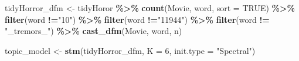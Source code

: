\documentclass[
]{article}
\newenvironment{Shaded}{\begin{snugshade}}{\end{snugshade}}
\newcommand{\AttributeTok}[1]{\textcolor[rgb]{0.13,0.29,0.53}{#1}}
\newcommand{\ConstantTok}[1]{\textcolor[rgb]{0.56,0.35,0.01}{#1}}
\newcommand{\DecValTok}[1]{\textcolor[rgb]{0.00,0.00,0.81}{#1}}
\newcommand{\FunctionTok}[1]{\textcolor[rgb]{0.13,0.29,0.53}{\textbf{#1}}}
\newcommand{\NormalTok}[1]{#1}
\newcommand{\OtherTok}[1]{\textcolor[rgb]{0.56,0.35,0.01}{#1}}
\newcommand{\SpecialCharTok}[1]{\textcolor[rgb]{0.81,0.36,0.00}{\textbf{#1}}}
\newcommand{\StringTok}[1]{\textcolor[rgb]{0.31,0.60,0.02}{#1}}
\begin{document}
\begin{Shaded}
\begin{Highlighting}[]
\NormalTok{tidyHorror\_dfm }\OtherTok{\textless{}{-}}\NormalTok{ tidyHoror }\SpecialCharTok{\%\textgreater{}\%} 
  \FunctionTok{count}\NormalTok{(Movie, word, }\AttributeTok{sort =} \ConstantTok{TRUE}\NormalTok{) }\SpecialCharTok{\%\textgreater{}\%} 
  \FunctionTok{filter}\NormalTok{(word }\SpecialCharTok{!=}\StringTok{"10"}\NormalTok{) }\SpecialCharTok{\%\textgreater{}\%} 
  \FunctionTok{filter}\NormalTok{(word }\SpecialCharTok{!=}\StringTok{"11944"}\NormalTok{) }\SpecialCharTok{\%\textgreater{}\%} 
  \FunctionTok{filter}\NormalTok{(word }\SpecialCharTok{!=} \StringTok{"\_tremors\_"}\NormalTok{) }\SpecialCharTok{\%\textgreater{}\%} 
  \FunctionTok{cast\_dfm}\NormalTok{(Movie, word, n)}

\NormalTok{topic\_model }\OtherTok{\textless{}{-}} \FunctionTok{stm}\NormalTok{(tidyHorror\_dfm, }\AttributeTok{K =} \DecValTok{6}\NormalTok{, }\AttributeTok{init.type =} \StringTok{"Spectral"}\NormalTok{)}
\end{Highlighting}
\end{Shaded}
\end{document}
